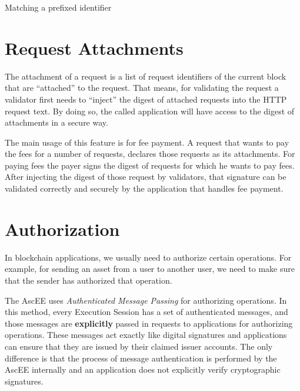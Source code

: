 \begin{algorithm}[h]
    \DontPrintSemicolon
    \BlankLine
    \BlankLine
    {
        {
            \;
        }
    }
    \;
    \caption{Matching a prefixed identifier}\label{alg:match_id}
\end{algorithm}

\section{Request Attachments}\label{sec:attachments}

The attachment of a request is a list of request identifiers of the current block that are ``attached'' to the request.
That means, for validating the request a validator first needs to ``inject'' the digest of attached requests into the
HTTP request text. By doing so, the called application will have access to the digest of attachments in a secure way.

The main usage of this feature is for fee payment. A request that wants to pay the fees for a number of requests,
declares those requests as its attachments. For paying fees the payer signs the digest of requests for which he
wants to pay fees. After injecting the digest of those request by validators, that signature can be validated
correctly and securely by the application that handles fee payment.


\section{Authorization}\label{sec:auth}

In blockchain applications, we usually need to authorize certain operations. For example, for sending an asset
from a user to another user, we need to make sure that the sender has authorized that operation.

The AscEE uses \emph{Authenticated Message Passing} for authorizing operations. In this method, every Execution
Session has a set of authenticated messages, and those messages are \textbf{explicitly} passed in requests to
applications for authorizing operations. These messages act exactly like digital signatures and applications can
ensure that they are issued by their claimed issuer accounts. The only difference is that the process of
message authentication is performed by the AscEE internally and an application does not explicitly verify cryptographic
signatures.

